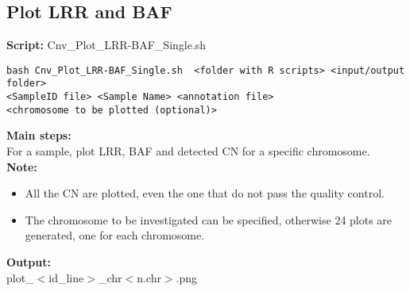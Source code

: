 \documentclass[11pt]{paper}
\begin{document}
\subsection{Plot LRR and BAF}
\textbf{Script:} Cnv\_Plot\_LRR-BAF\_Single.sh
\begin{verbatim}
bash Cnv_Plot_LRR-BAF_Single.sh  <folder with R scripts> <input/output folder> 
<SampleID file> <Sample Name> <annotation file> 
<chromosome to be plotted (optional)>  
\end{verbatim}
\textbf{Main steps:}\\
For a sample, plot LRR, BAF and detected CN for a specific chromosome.\\
\noindent \textbf{Note:}
\begin{itemize}
\item All the CN are plotted, even the one that do not pass the quality control.
\item The chromosome to be investigated can be specified, otherwise 24 plots are generated, one for each chromosome.
\end{itemize}
\noindent \textbf{Output:}\\
plot\_$<$id\_line$>$\_chr$<$n.chr$>$.png
\end{document}
